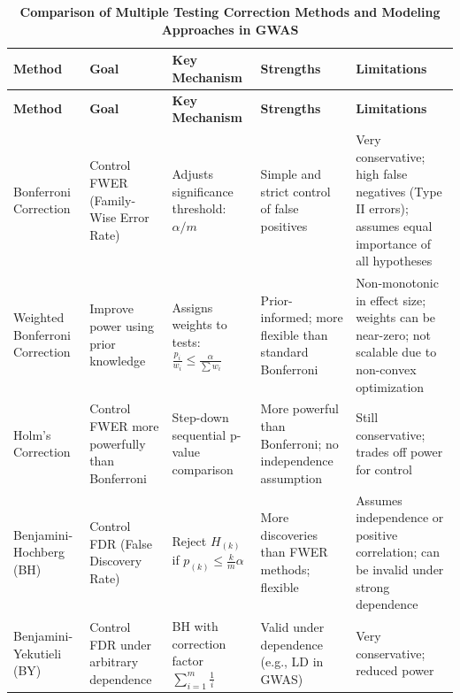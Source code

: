 \documentclass[12pt]{article}
\begin{document}
\sloppy  %
\renewcommand{\arraystretch}{1.3} %
\begin{longtable}{|>{\raggedright\arraybackslash}p{3cm}%
                  |>{\raggedright\arraybackslash}p{2.7cm}%
                  |>{\raggedright\arraybackslash}p{3cm}%
                  |>{\raggedright\arraybackslash}p{3.1cm}%
                  |>{\raggedright\arraybackslash}p{3.7cm}|}
\caption{\textbf{Comparison of Multiple Testing Correction Methods and Modeling Approaches in GWAS}} \label{tab:methods_gwas} \\
\hline
\textbf{Method} & \textbf{Goal} & \textbf{Key Mechanism} & \textbf{Strengths} & \textbf{Limitations} \\
\hline
\endfirsthead
\hline
\textbf{Method} & \textbf{Goal} & \textbf{Key Mechanism} & \textbf{Strengths} & \textbf{Limitations} \\
\hline
\endhead

Bonferroni Correction &
Control FWER (Family-Wise Error Rate) &
Adjusts significance threshold: $\alpha / m$ &
Simple and strict control of false positives &
Very conservative; high false negatives (Type II errors); assumes equal importance of all hypotheses \\
\hline

Weighted Bonferroni Correction &
Improve power using prior knowledge &
Assigns weights to tests: $\frac{p_i}{w_i} \leq \frac{\alpha}{\sum w_i}$ &
Prior-informed; more flexible than standard Bonferroni &
Non-monotonic in effect size; weights can be near-zero; not scalable due to non-convex optimization \\
\hline

Holm’s Correction &
Control FWER more powerfully than Bonferroni &
Step-down sequential p-value comparison &
More powerful than Bonferroni; no independence assumption &
Still conservative; trades off power for control \\
\hline

Benjamini-Hochberg (BH) &
Control FDR (False Discovery Rate) &
Reject $H_{(k)}$ if $p_{(k)} \leq \frac{k}{m}\alpha$ &
More discoveries than FWER methods; flexible &
Assumes independence or positive correlation; can be invalid under strong dependence \\
\hline

Benjamini-Yekutieli (BY) &
Control FDR under arbitrary dependence &
BH with correction factor $\sum_{i=1}^{m} \frac{1}{i}$ &
Valid under dependence (e.g., LD in GWAS) &
Very conservative; reduced power \\
\hline


\end{longtable}
\end{document}
